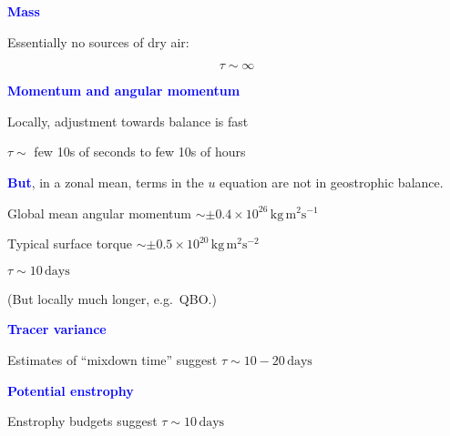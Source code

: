 \documentclass[a4]{seminar}
\newcommand{\B}[1]{\textcolor{blue}{#1}}
\begin{document}
\begin{slide}

\B{\bf Mass}

\vspace{3mm}

Essentially no sources of dry air:

\begin{displaymath}
\tau \sim \infty
\end{displaymath}


\end{slide}


\begin{slide}

\B{\bf Momentum and angular momentum}

\vspace{3mm}

Locally, adjustment towards balance is fast

\( \tau \sim \) few 10s of seconds to
few 10s of hours

\vspace{3mm}

\B{\bf But}, in a zonal mean, terms in the \( u \) equation
are not in geostrophic balance.

Global mean angular momentum
\( \sim \pm 0.4 \times 10^{26} \, \mathrm{kg}\,\mathrm{m}^2 \mathrm{s}^{-1} \)

Typical surface torque
\( \sim \pm 0.5 \times 10^{20} \, \mathrm{kg}\,\mathrm{m}^2 \mathrm{s}^{-2} \)

\( \tau \sim 10 \, \mathrm{days} \)

\vspace{2mm}

(But locally much longer, e.g.\ QBO.)


\end{slide}


\begin{slide}

\B{\bf Tracer variance}

\vspace{2mm}

Estimates of ``mixdown time'' suggest \( \tau \sim 10-20 \, \mathrm{days} \)


\vspace{3mm}

\B{\bf Potential enstrophy}

\vspace{2mm}

Enstrophy budgets suggest \( \tau \sim 10 \, \mathrm{days} \)



\end{slide}
\end{document}
